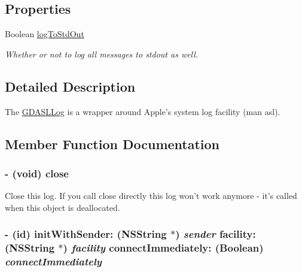 \subsection*{Properties}
\begin{DoxyCompactItemize}
\item 
\hypertarget{interface_g_d_a_s_l_log_af52ec0d7d7a656c095fc8af8d7035065}{
Boolean \hyperlink{interface_g_d_a_s_l_log_af52ec0d7d7a656c095fc8af8d7035065}{logToStdOut}}
\label{interface_g_d_a_s_l_log_af52ec0d7d7a656c095fc8af8d7035065}

\begin{DoxyCompactList}\small\item\em Whether or not to log all messages to stdout as well. \item\end{DoxyCompactList}\end{DoxyCompactItemize}


\subsection{Detailed Description}
The \hyperlink{interface_g_d_a_s_l_log}{GDASLLog} is a wrapper around Apple's system log facility (man asl). 

\subsection{Member Function Documentation}
\hypertarget{interface_g_d_a_s_l_log_ae49db911364a0162197ad1044126c664}{
\subsubsection[{close}]{\setlength{\rightskip}{0pt plus 5cm}-\/ (void) close }}
\label{interface_g_d_a_s_l_log_ae49db911364a0162197ad1044126c664}


Close this log. If you call close directly this log won't work anymore -\/ it's called when this object is deallocated. \hypertarget{interface_g_d_a_s_l_log_ac9553b0e41554a4d75a35f6bd5280956}{
\subsubsection[{initWithSender:facility:connectImmediately:}]{\setlength{\rightskip}{0pt plus 5cm}-\/ (id) initWithSender: (NSString $\ast$) {\em sender}\/ facility: (NSString $\ast$) {\em facility}\/ connectImmediately: (Boolean) {\em connectImmediately}}}
\label{interface_g_d_a_s_l_log_ac9553b0e41554a4d75a35f6bd5280956}


